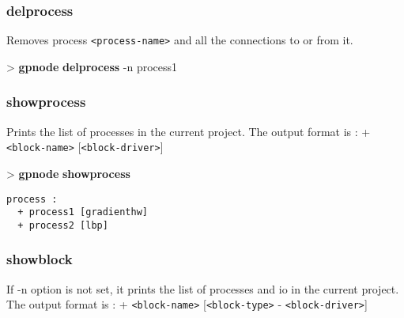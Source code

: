 \documentclass[10pt,a4paper]{article}
\begin{document}

\subsubsection{delprocess}

Removes process \texttt{<process-name>} and all the connections to or from it.


\begin{sampletitle}
> \textbf{gpnode} \textbf{delprocess} -n process1
\end{sampletitle}


\subsubsection{showprocess}

Prints the list of processes in the current project. The output format is : + \texttt{<block-name>} [\texttt{<block-driver>}]

\begin{sampletitle}
> \textbf{gpnode} \textbf{showprocess}
\begin{Verbatim}
process :
  + process1 [gradienthw]
  + process2 [lbp]
\end{Verbatim}
\end{sampletitle}

\subsubsection{showblock}

If -n option is not set, it prints the list of processes and io in the current project. The output format is : + \texttt{<block-name>} [\texttt{<block-type>} - \texttt{<block-driver>}]

\end{document}
